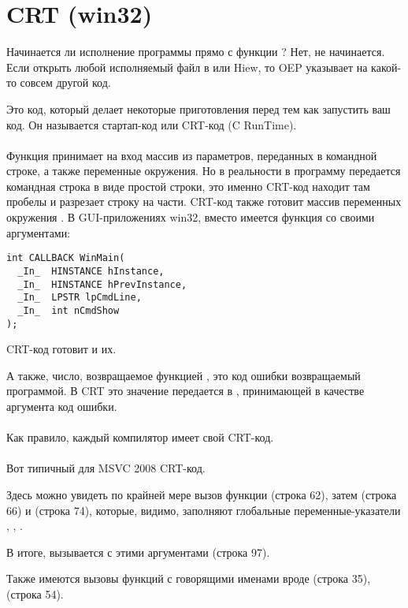 \section{CRT (win32)}
\label{sec:CRT}

Начинается ли исполнение программы прямо с функции \main{}?
Нет, не начинается.
Если открыть любой исполняемый файл в \IDA или Hiew, 
то \ac{OEP} указывает на какой-то совсем другой код.

Это код, который делает некоторые приготовления перед тем как запустить ваш код.
Он называется стартап-код или CRT-код (C RunTime). \\
\\
Функция \main{} принимает на вход массив из параметров, переданных в командной строке, а также
переменные окружения.
Но в реальности в программу передается командная строка в виде простой строки, это именно
CRT-код находит там пробелы и разрезает строку на части.
CRT-код также готовит массив переменных окружения .
В \ac{GUI}-приложениях win32, вместо \main{} имеется функция  со своими аргументами:

\begin{lstlisting}
int CALLBACK WinMain(
  _In_  HINSTANCE hInstance,
  _In_  HINSTANCE hPrevInstance,
  _In_  LPSTR lpCmdLine,
  _In_  int nCmdShow
);
\end{lstlisting}

CRT-код готовит и их.

А также, число, возвращаемое функцией \main{}, это код ошибки возвращаемый программой.
В CRT это значение передается в , принимающей в качестве аргумента код ошибки. \\
\\
Как правило, каждый компилятор имеет свой CRT-код. \\
\\
Вот типичный для MSVC 2008 CRT-код.



Здесь можно увидеть по крайней мере вызов
функции  (строка 62), 
затем  (строка 66) и  (строка 74),
которые, видимо, заполняют глобальные переменные-указатели
, , .

В итоге, вызывается \main{} с этими аргументами (строка 97).

Также имеются вызовы функций с говорящими именами вроде  (строка 35),  (строка 54).

